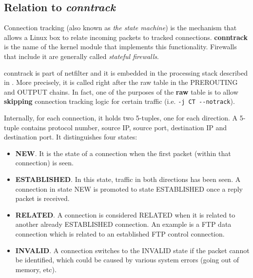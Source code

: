 \subsection{Relation to \emph{conntrack}}
\lstset{language=sh,basicstyle=\ttfamily}

Connection tracking (also known as \emph{the state machine}) is the mechanism
that allows a Linux box to relate incoming packets to tracked connections.
\textbf{conntrack} is the name of the kernel module that implements this
functionality.  Firewalls that include it are generally called \emph{stateful
firewalls}.

conntrack is part of netfilter and it is embedded in the processing stack
described in .  More
precisely, it is called right after the raw table in the PREROUTING and OUTPUT
chains.  In fact, one of the purposes of the \textbf{raw} table is to allow
\textbf{skipping} connection tracking logic for certain traffic (i.e.
\lstinline{-j CT --notrack}).

Internally, for each connection, it holds two 5-tuples, one for each direction.
A 5-tuple contains protocol number, source IP, source port, destination IP and
destination port.  It distinguishes four states:
\begin{itemize}
  \item \textbf{NEW}.  It is the state of a connection when the first packet
    (within that connection) is seen.
  \item \textbf{ESTABLISHED}.  In this state, traffic in both directions has
    been seen.  A connection in state NEW is promoted to state ESTABLISHED once
    a reply packet is received.
  \item \textbf{RELATED}.  A connection is considered RELATED when it is
    related to another already ESTABLISHED connection.  An example is a FTP
    data connection which is related to an established FTP control connection.
  \item \textbf{INVALID}.  A connection switches to the INVALID state if the
    packet cannot be identified, which could be caused by various system errors
    (going out of memory, etc).
\end{itemize}

